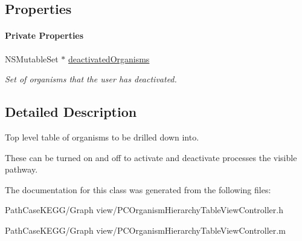 \subsection*{Properties}
\begin{Indent}\paragraph*{Private Properties}
\begin{DoxyCompactItemize}
\item 
\hypertarget{interface_p_c_organism_hierarchy_table_view_controller_af3855937b2f37eec77f9599a311d9612}{
NSMutableSet $\ast$ \hyperlink{interface_p_c_organism_hierarchy_table_view_controller_af3855937b2f37eec77f9599a311d9612}{deactivatedOrganisms}}
\label{interface_p_c_organism_hierarchy_table_view_controller_af3855937b2f37eec77f9599a311d9612}

\begin{DoxyCompactList}\small\item\em Set of organisms that the user has deactivated. \end{DoxyCompactList}\end{DoxyCompactItemize}
\end{Indent}


\subsection{Detailed Description}
Top level table of organisms to be drilled down into. 

These can be turned on and off to activate and deactivate processes the visible pathway. 

The documentation for this class was generated from the following files:\begin{DoxyCompactItemize}
\item 
PathCaseKEGG/Graph view/PCOrganismHierarchyTableViewController.h\item 
PathCaseKEGG/Graph view/PCOrganismHierarchyTableViewController.m\end{DoxyCompactItemize}
